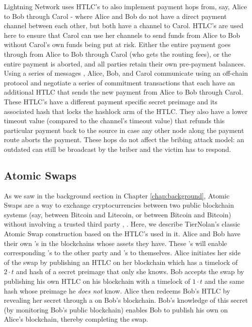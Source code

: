 Lightning Network uses HTLC's to also implement payment hops from, say, Alice to Bob through Carol - where Alice and Bob do not have a direct payment channel between each other, but both have a channel to Carol. HTLC's are used here to ensure that Carol can use her channels to send funds from Alice to Bob without Carol's own funds being put at risk. Either the entire payment goes through from Alice to Bob through Carol (who gets the routing fees), or the entire payment is aborted, and all parties retain their own pre-payment balances. Using a series of messages \cite{bolt_3}, Alice, Bob, and Carol communicate using an off-chain protocol and negotiate a series of commitment transactions that each have an additional HTLC that sends the new payment from Alice to Bob through Carol. These HTLC's have a different payment specific secret preimage and its associated hash that locks the hashlock arm of the HTLC. They also have a lower timeout value (compared to the channel's timeout value) that refunds this particular payment back to the source in case any other node along the payment route aborts the payment. These hops do not affect the bribing attack model: an outdated \ctx{} can still be broadcast by the briber and the victim has to respond.

\subsection{Atomic Swaps}
As we saw in the background section in Chapter \ref{chap:background}, Atomic Swaps are a way to exchange cryptocurrencies between two public blockchain systems (say, between Bitcoin and Litecoin, or between Bitcoin and Bitcoin) without involving a trusted third party \cite{herlihy2018atomic}, \cite{atomic_swaps_american_call_options}. Here, we describe TierNolan's classic Atomic Swap construction \cite{atomic_swap} based on the HTLC's used in it. Alice and Bob have their own \htlctxn's in the blockchains whose assets they have. These \htlctxn's will enable corresponding \sellertxn{}'s to the other party and 's to themselves. Alice initiates her side of the swap by publishing an HTLC on her blockchain which has a timelock of $2\cdot t$ and hash of a secret preimage that only she knows. Bob accepts the swap by publishing his own HTLC on his blockchain with a timelock of $1\cdot t$ and the same hash whose preimage he \emph{does not} know. Alice then redeems Bob's HTLC by revealing her secret through a \sellertxn{} on Bob's blockchain. Bob's knowledge of this secret (by monitoring Bob's public blockchain) enables Bob to publish his own \sellertxn{} on Alice's blockchain, thereby completing the swap. 

